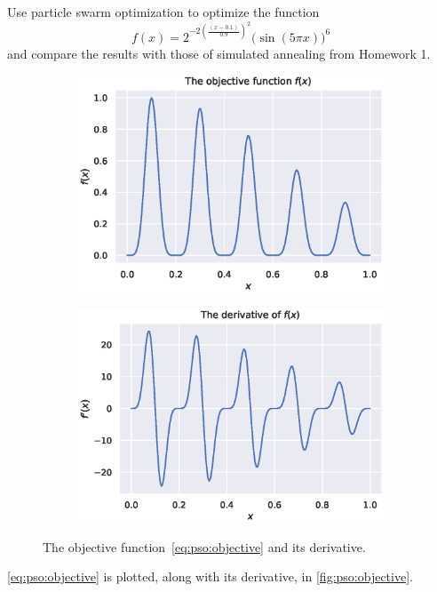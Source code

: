 \documentclass[12pt]{article}
\begin{document}
Use particle swarm optimization to optimize the function
\begin{equation}
    f(x) = 2^{-2{\left(\frac{(x - 0.1)}{0.9}\right)}^2}{\big(\sin(5\pi x)\big)}^6\label{eq:pso:objective}
\end{equation}
and compare the results with those of simulated annealing from Homework 1.
\begin{figure}
    \centering
    \begin{subfigure}[b]{0.49\textwidth}
        \centering
        \includegraphics[width=\textwidth]{figures/pso/prob1-function.eps}
    \end{subfigure}
    \begin{subfigure}[b]{0.49\textwidth}
        \centering
        \includegraphics[width=\textwidth]{figures/pso/prob1-derivative.eps}
    \end{subfigure}
    \caption{The objective function~\ref{eq:pso:objective} and its derivative.}\label{fig:pso:objective}
\end{figure}
\autoref{eq:pso:objective} is plotted, along with its derivative, in \autoref{fig:pso:objective}.
\end{document}
